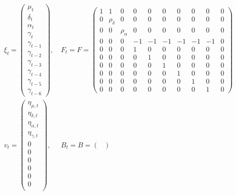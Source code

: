 \documentclass[12pt]{article}
\numberwithin{equation}{section}
\begin{document}
\begin{align*}
    \xi_t = \begin{pmatrix}
        \mu_t \\
        \delta_t \\
        \alpha_t \\
        \gamma_t \\
        \gamma_{t-1} \\
        \gamma_{t-2} \\
        \gamma_{t-3} \\
        \gamma_{t-4} \\
        \gamma_{t-5} \\
        \gamma_{t-6}
    \end{pmatrix}, 
    &\ 
    F_t = F = \begin{pmatrix}
        1 & 1 & 0 & 0 & 0 & 0 & 0 & 0 & 0 & 0 \\
        0 & \rho_{\delta} & 0 & 0 & 0 & 0 & 0 & 0 & 0 & 0 \\
        0 & 0 & \rho_{\alpha} & 0 & 0 & 0 & 0 & 0 & 0 & 0 \\
        0 & 0 & 0 & -1 & -1 & -1 & -1 & -1 & -1 & 0 \\
        0 & 0 & 0 & 1 & 0 & 0 & 0 & 0 & 0 & 0 \\
        0 & 0 & 0 & 0 & 1 & 0 & 0 & 0 & 0 & 0 \\
        0 & 0 & 0 & 0 & 0 & 1 & 0 & 0 & 0 & 0 \\
        0 & 0 & 0 & 0 & 0 & 0 & 1 & 0 & 0 & 0 \\
        0 & 0 & 0 & 0 & 0 & 0 & 0 & 1 & 0 & 0 \\
        0 & 0 & 0 & 0 & 0 & 0 & 0 & 0 & 1 & 0
    \end{pmatrix} \\
    v_t = \begin{pmatrix}
        \eta_{\mu,t} \\
        \eta_{\delta,t} \\
        \eta_{\alpha,t} \\
        \eta_{\gamma,t} \\
        0 \\
        0 \\
        0 \\
        0 \\
        0 \\
        0 \\
    \end{pmatrix},
    &\ 
    B_t = B = \begin{pmatrix}

\end{pmatrix}
\end{align*}
\end{document}
